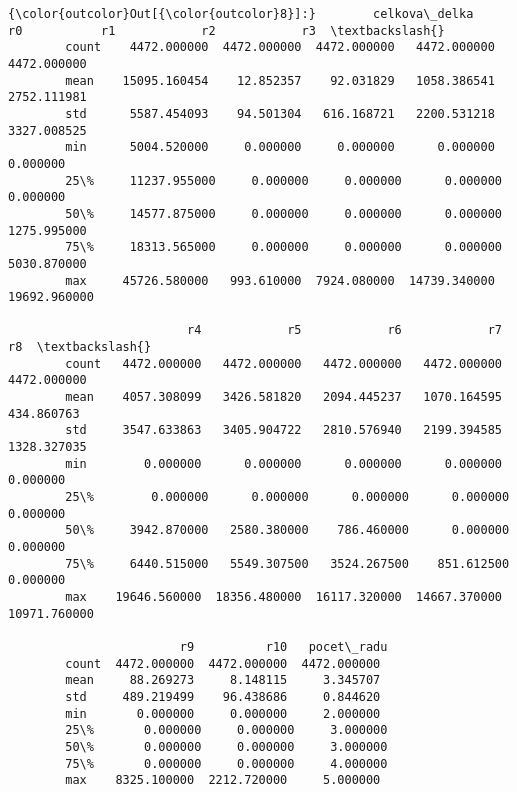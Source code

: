 \documentclass[11pt]{article}
\begin{document}
\begin{Verbatim}[commandchars=\\\{\}]
{\color{outcolor}Out[{\color{outcolor}8}]:}        celkova\_delka           r0           r1            r2            r3  \textbackslash{}
        count    4472.000000  4472.000000  4472.000000   4472.000000   4472.000000   
        mean    15095.160454    12.852357    92.031829   1058.386541   2752.111981   
        std      5587.454093    94.501304   616.168721   2200.531218   3327.008525   
        min      5004.520000     0.000000     0.000000      0.000000      0.000000   
        25\%     11237.955000     0.000000     0.000000      0.000000      0.000000   
        50\%     14577.875000     0.000000     0.000000      0.000000   1275.995000   
        75\%     18313.565000     0.000000     0.000000      0.000000   5030.870000   
        max     45726.580000   993.610000  7924.080000  14739.340000  19692.960000   
        
                         r4            r5            r6            r7            r8  \textbackslash{}
        count   4472.000000   4472.000000   4472.000000   4472.000000   4472.000000   
        mean    4057.308099   3426.581820   2094.445237   1070.164595    434.860763   
        std     3547.633863   3405.904722   2810.576940   2199.394585   1328.327035   
        min        0.000000      0.000000      0.000000      0.000000      0.000000   
        25\%        0.000000      0.000000      0.000000      0.000000      0.000000   
        50\%     3942.870000   2580.380000    786.460000      0.000000      0.000000   
        75\%     6440.515000   5549.307500   3524.267500    851.612500      0.000000   
        max    19646.560000  18356.480000  16117.320000  14667.370000  10971.760000   
        
                        r9          r10   pocet\_radu  
        count  4472.000000  4472.000000  4472.000000  
        mean     88.269273     8.148115     3.345707  
        std     489.219499    96.438686     0.844620  
        min       0.000000     0.000000     2.000000  
        25\%       0.000000     0.000000     3.000000  
        50\%       0.000000     0.000000     3.000000  
        75\%       0.000000     0.000000     4.000000  
        max    8325.100000  2212.720000     5.000000  
\end{Verbatim}
            
\end{document}
